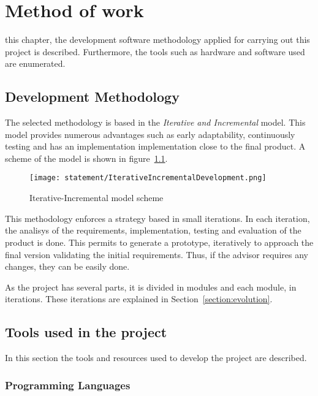\chapter{Method of work}
\label{chap:method}
 this chapter, the development software methodology applied for carrying
out this project is described. Furthermore, the tools such as hardware and software used are enumerated.
 
\section{Development Methodology}
The selected methodology is based in the \emph{Iterative and Incremental}
model. This model provides numerous advantages such as early adaptability,
continuously testing and has an implementation implementation close to the final product. A
scheme of the model is shown in figure~\ref{fig:IncrementalModel}.


\begin{figure}[!h]
\begin{center}
\texttt{[image: statement/IterativeIncrementalDevelopment.png]}
\caption{Iterative-Incremental model scheme}
\label{fig:IncrementalModel}
\end{center}
\end{figure}

This methodology enforces a strategy based in small iterations. In each
iteration, the analisys of the requirements, implementation, testing and
evaluation of the product is done. This permits to generate a prototype,
iteratively to approach the final version validating the initial
requirements. Thus, if the advisor requires any changes, they can be easily done.
 
As the project has several parts, it is divided in modules and each module, in iterations. These iterations are explained in Section~\ref{section:evolution}.

\section{Tools used in the project}

In this section the tools and resources used to develop the project are described.  



\subsection{Programming Languages}

